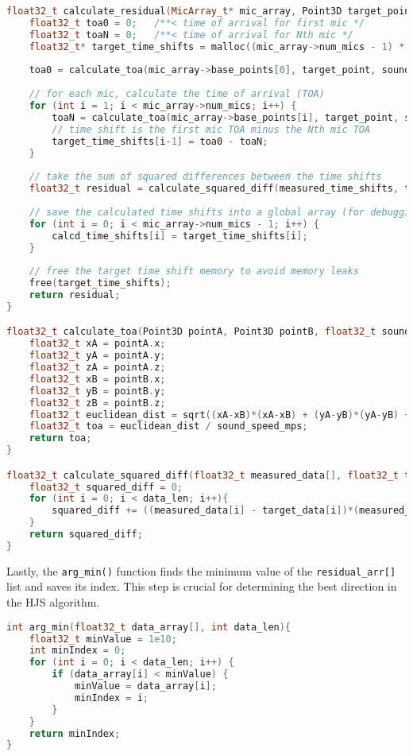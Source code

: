 \documentclass[11pt]{ucthesisCP}
\begin{document}
\begin{lstlisting}[language=C++]
float32_t calculate_residual(MicArray_t* mic_array, Point3D target_point, float32_t measured_time_shifts[]) {
	float32_t toa0 = 0;   /**< time of arrival for first mic */
	float32_t toaN = 0;   /**< time of arrival for Nth mic */
	float32_t* target_time_shifts = malloc((mic_array->num_mics - 1) * sizeof(float32_t));
	
	toa0 = calculate_toa(mic_array->base_points[0], target_point, sound_speed_mps);
	
	// for each mic, calculate the time of arrival (TOA)
	for (int i = 1; i < mic_array->num_mics; i++) {
		toaN = calculate_toa(mic_array->base_points[i], target_point, sound_speed_mps);
		// time shift is the first mic TOA minus the Nth mic TOA
		target_time_shifts[i-1] = toa0 - toaN;
	}
	
	// take the sum of squared differences between the time shifts
	float32_t residual = calculate_squared_diff(measured_time_shifts, target_time_shifts, mic_array->num_mics - 1);
	
	// save the calculated time shifts into a global array (for debugging / comparing to the real estimates)
	for (int i = 0; i < mic_array->num_mics - 1; i++) {
		calcd_time_shifts[i] = target_time_shifts[i];
	}
	
	// free the target time shift memory to avoid memory leaks
	free(target_time_shifts);
	return residual;
}

float32_t calculate_toa(Point3D pointA, Point3D pointB, float32_t sound_speed_mps) {
	float32_t xA = pointA.x;
	float32_t yA = pointA.y;
	float32_t zA = pointA.z;
	float32_t xB = pointB.x;
	float32_t yB = pointB.y;
	float32_t zB = pointB.z;
	float32_t euclidean_dist = sqrt((xA-xB)*(xA-xB) + (yA-yB)*(yA-yB) + (zA-zB)*(zA-zB));
	float32_t toa = euclidean_dist / sound_speed_mps;
	return toa;
}

float32_t calculate_squared_diff(float32_t measured_data[], float32_t target_data[], int data_len){
	float32_t squared_diff = 0;
	for (int i = 0; i < data_len; i++){
		squared_diff += ((measured_data[i] - target_data[i])*(measured_data[i] - target_data[i]));
	}
	return squared_diff;
}
\end{lstlisting}

Lastly, the \verb|arg_min()| function finds the minimum value of the \verb|residual_arr[]| list and saves its index. This step is crucial for determining the best direction in the HJS algorithm.

\begin{lstlisting}[language=C++]
int arg_min(float32_t data_array[], int data_len){
	float32_t minValue = 1e10;
	int minIndex = 0;
	for (int i = 0; i < data_len; i++) {
		if (data_array[i] < minValue) {
			minValue = data_array[i];
			minIndex = i;
		}
	}
	return minIndex;
}
\end{lstlisting}
\end{document}
